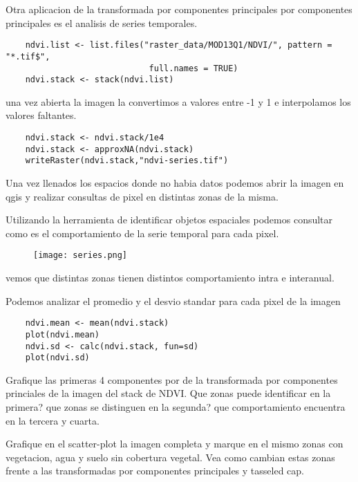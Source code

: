 \begin{exa}
    Otra aplicacion de la transformada por componentes principales por
    componentes principales es el analisis de series temporales.
    \begin{lstlisting}
    ndvi.list <- list.files("raster_data/MOD13Q1/NDVI/", pattern = "*.tif$",
                             full.names = TRUE)
    ndvi.stack <- stack(ndvi.list)
    \end{lstlisting}
    una vez abierta la imagen la convertimos a valores entre -1 y 1 e
    interpolamos los valores faltantes.
    \begin{lstlisting}
    ndvi.stack <- ndvi.stack/1e4
    ndvi.stack <- approxNA(ndvi.stack)
    writeRaster(ndvi.stack,"ndvi-series.tif")
    \end{lstlisting}
    Una vez llenados los espacios donde no habia datos podemos abrir la imagen
    en qgis y realizar consultas de pixel en distintas zonas de la misma.

    Utilizando la herramienta de identificar objetos espaciales podemos
    consultar como es el comportamiento de la serie temporal para cada pixel.
    \begin{figure}[h!]
    \begin{center}
        \texttt{[image: series.png]}
    \end{center}
    \caption{}
    \label{fig:series}
    \end{figure}
    vemos que distintas zonas tienen distintos comportamiento intra e
    interanual.

    Podemos analizar el promedio y el desvio standar para cada pixel de la
    imagen
    \begin{lstlisting}
    ndvi.mean <- mean(ndvi.stack)
    plot(ndvi.mean)
    ndvi.sd <- calc(ndvi.stack, fun=sd)
    plot(ndvi.sd)
    \end{lstlisting}
\end{exa}

\begin{act}
    Grafique las primeras 4 componentes por de la transformada por componentes
    princiales de la imagen del stack de NDVI\@. Que zonas puede identificar en la
    primera? que zonas se distinguen en la segunda? que comportamiento encuentra
    en la tercera y cuarta.
\end{act}

\begin{act}
    Grafique en el scatter-plot la imagen completa y marque en el mismo zonas
    con vegetacion, agua y suelo sin cobertura vegetal. Vea como cambian estas
    zonas frente a las transformadas por componentes principales y tasseled cap.
\end{act}
